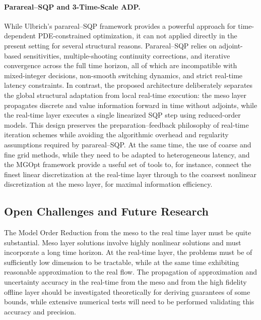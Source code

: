 \documentclass{article}
\newcommand{\1}{\mathds{1}}          %
\theoremstyle{definition}
\begin{document}
\begin{sloppypar}
\paragraph{Parareal--SQP and 3-Time-Scale ADP.} While Ulbrich’s parareal--SQP framework provides a powerful approach for
time-dependent PDE-constrained optimization, it can not applied directly in the
present setting for several structural reasons.
Parareal--SQP relies on adjoint-based sensitivities, multiple-shooting continuity
corrections, and iterative convergence across the full time horizon, all of which
are incompatible with mixed-integer decisions, non-smooth switching dynamics,
and strict real-time latency constraints. In contrast, the proposed architecture deliberately separates the global structural adaptation from local real-time execution: the meso layer propagates discrete and value information forward in time without adjoints, while the real-time layer executes a single linearized SQP step using reduced-order models. This design preserves the preparation--feedback philosophy of real-time iteration schemes while avoiding the algorithmic overhead and regularity assumptions required by parareal--SQP. At the same time, the use of coarse and fine grid methods, while they need to be adapted to heterogeneous latency, and the MGOpt framework provide a useful set of tools to, for instance, connect the finest linear discretization at the real-time layer through to the coarsest nonlinear discretization at the meso layer, for maximal information efficiency.


\subsection{Open Challenges and Future Research}

The Model Order Reduction from the meso to the real time layer must be quite substantial. Meso layer solutions involve highly nonlinear solutions and must incorporate a long time horizon. At the real-time layer, the problems must be of sufficiently low dimension to be tractable, while at the same time exhibiting reasonable approximation to the real flow. The propagation of approximation and uncertainty accuracy in the real-time from the meso and from the high fidelity offline layer should be investigated theoretically for deriving guarantees of some bounds, while extensive numerical tests will need to be performed validating this accuracy and precision. 





\end{sloppypar}
\end{document}
